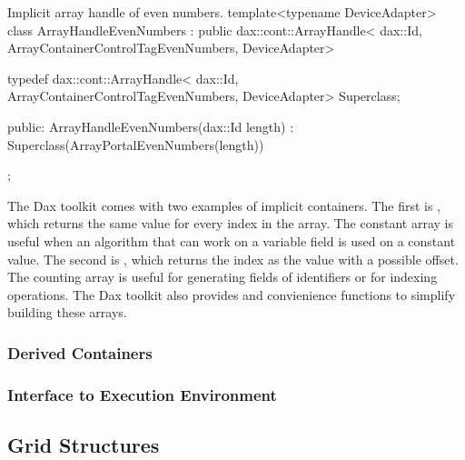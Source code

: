 \begin{daxexample}{Implicit array handle of even numbers.}
template<typename DeviceAdapter>
class ArrayHandleEvenNumbers
    : public dax::cont::ArrayHandle<
                dax::Id, ArrayContainerControlTagEvenNumbers, DeviceAdapter>
{
  typedef dax::cont::ArrayHandle<
                dax::Id, ArrayContainerControlTagEvenNumbers, DeviceAdapter> Superclass;

public:
  ArrayHandleEvenNumbers(dax::Id length)
    : Superclass(ArrayPortalEvenNumbers(length)) {  }
};
\end{daxexample}

The Dax toolkit comes with two examples of implicit containers. The first
is , which returns the same value for every
index in the array. The constant array is useful when an algorithm that can
work on a variable field is used on a constant value. The second is
, which returns the index as the value with a
possible offset. The counting array is useful for generating fields of
identifiers or for indexing operations. The Dax toolkit also provides
 and 
convienience functions to simplify building these arrays.


\subsubsection{Derived Containers}





\subsubsection{Interface to Execution Environment}



\subsection{Grid Structures}
\label{sec:GridStructures}

